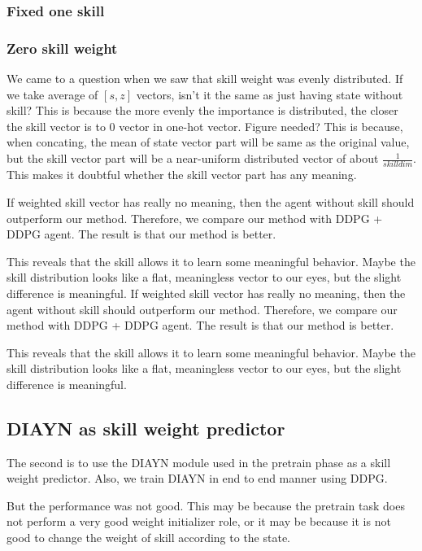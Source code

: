 \subsubsection{Fixed one skill}

\subsubsection{Zero skill weight}
We came to a question when we saw that skill weight was evenly distributed.
If we take average of ${[s,z]}$ vectors, isn't it the same as just having state without skill?
This is because the more evenly the importance is distributed, the closer the skill vector is to 0 vector in one-hot vector. Figure needed?
This is because, when concating, the mean of state vector part will be same as the original value,
but the skill vector part will be a near-uniform distributed vector of about $\frac{1}{skilldim}$.
This makes it doubtful whether the skill vector part has any meaning.

If weighted skill vector has really no meaning, then the agent without skill should outperform our method.
Therefore, we compare our method with DDPG + DDPG agent. The result is that our method is better.

This reveals that the skill allows it to learn some meaningful behavior.
Maybe the skill distribution looks like a flat, meaningless vector to our eyes, but the slight difference is meaningful.
If weighted skill vector has really no meaning, then the agent without skill should outperform our method.
Therefore, we compare our method with DDPG + DDPG agent. The result is that our method is better.

This reveals that the skill allows it to learn some meaningful behavior.
Maybe the skill distribution looks like a flat, meaningless vector to our eyes, but the slight difference is meaningful.

\subsection{DIAYN as skill weight predictor}
The second is to use the DIAYN module used in the pretrain phase as a skill weight predictor.
Also, we train DIAYN in end to end manner using DDPG.

 But the performance was not good. This may be because the pretrain task does not perform a very good weight initializer role,
 or it may be because it is not good to change the weight of skill according to the state.

